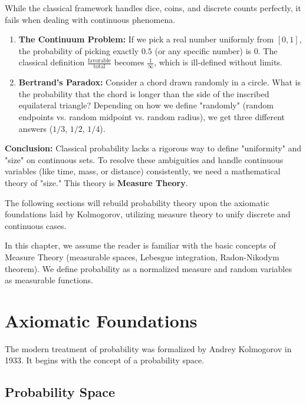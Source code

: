 While the classical framework handles dice, coins, and discrete counts perfectly, it fails when dealing with continuous phenomena.

\begin{enumerate}
    \item \textbf{The Continuum Problem:} If we pick a real number uniformly from $[0, 1]$, the probability of picking exactly $0.5$ (or any specific number) is 0. The classical definition $\frac{\text{favorable}}{\text{total}}$ becomes $\frac{1}{\infty}$, which is ill-defined without limits.
    
    \item \textbf{Bertrand's Paradox:} Consider a chord drawn randomly in a circle. What is the probability that the chord is longer than the side of the inscribed equilateral triangle?
    Depending on how we define "randomly" (random endpoints vs. random midpoint vs. random radius), we get three different answers ($1/3$, $1/2$, $1/4$).
\end{enumerate}

\textbf{Conclusion:} Classical probability lacks a rigorous way to define "uniformity" and "size" on continuous sets. To resolve these ambiguities and handle continuous variables (like time, mass, or distance) consistently, we need a mathematical theory of "size." This theory is \textbf{Measure Theory}.

The following sections will rebuild probability theory upon the axiomatic foundations laid by Kolmogorov, utilizing measure theory to unify discrete and continuous cases.

\begin{remark}
In this chapter, we assume the reader is familiar with the basic concepts of Measure Theory (measurable spaces, Lebesgue integration, Radon-Nikodym theorem). We define probability as a normalized measure and random variables as measurable functions.
\end{remark}

\section{Axiomatic Foundations}

The modern treatment of probability was formalized by Andrey Kolmogorov in 1933. It begins with the concept of a probability space.

\subsection{Probability Space}

